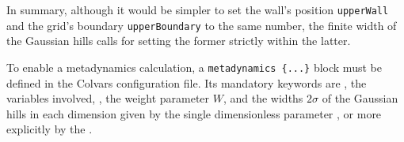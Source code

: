 In summary, although it would be simpler to set the wall's position \texttt{upperWall} and the grid's boundary \texttt{upperBoundary} to the same number, the finite width of the Gaussian hills calls for setting the former strictly within the latter.



To enable a metadynamics calculation, a \texttt{metadynamics \{...\}} block must be defined in the Colvars configuration file.
Its mandatory keywords are , the variables involved, , the weight parameter $W$, and the widths $2\sigma$ of the Gaussian hills in each dimension given by the single dimensionless parameter , or more explicitly by the .

